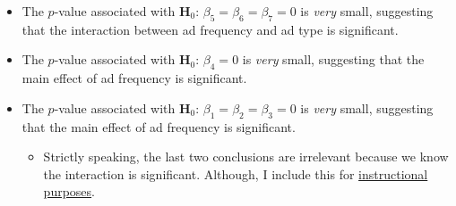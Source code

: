 \begin{itemize}
\begin{itemize}
                  \item The $ p $-value associated with $ \mathbf{H}_0 $: $ \beta_5=\beta_6=\beta_7=0 $ is \emph{very} small, suggesting that the interaction
                        between ad frequency and ad type is significant.
                  \item The $ p $-value associated with $ \mathbf{H}_0 $: $ \beta_4=0 $ is \emph{very} small, suggesting that the main effect of ad frequency is significant.
                  \item The $ p $-value associated with $ \mathbf{H}_0 $: $ \beta_1=\beta_2=\beta_3=0 $ is \emph{very} small, suggesting that the main effect of ad frequency is significant.
                        \begin{itemize}
                              \item Strictly speaking, the last two conclusions are irrelevant because we know the interaction is significant. Although, I include this for \underline{instructional purposes}.
                        \end{itemize}
            \end{itemize}
\end{itemize}
